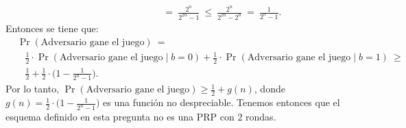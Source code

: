 \begin{enumerate}
\begin{align*}
  & \hspace{100pt} = \ \frac{2^n}{2^{2n}-1} \ \leq \ \frac{2^n}{2^{2n}-2^n} \ = \ \frac{1}{2^n-1}.
\end{align*}
Entonces se tiene que:
\begin{align*}
  &\Pr(\text{Adversario gane el juego}) \ =\\
  &\hspace{10pt}\frac{1}{2} \cdot \Pr(\text{Adversario gane el juego} \mid b=0) + \frac{1}{2} \cdot \Pr(\text{Adversario gane el juego} \mid b=1) \ \geq\\
  &\hspace{10pt}\frac{1}{2} + \frac{1}{2} \cdot \bigg(1 - \frac{1}{2^n-1}\bigg).
\end{align*}
Por lo tanto, $\Pr(\text{Adversario gane el juego}) \geq \frac{1}{2} + g(n)$, donde $g(n) = \frac{1}{2} \cdot \big(1 - \frac{1}{2^n-1}\big)$ es una función no despreciable. 
Tenemos entonces que  el esquema definido en esta pregunta no es una PRP con $2$
rondas.
\end{enumerate}

